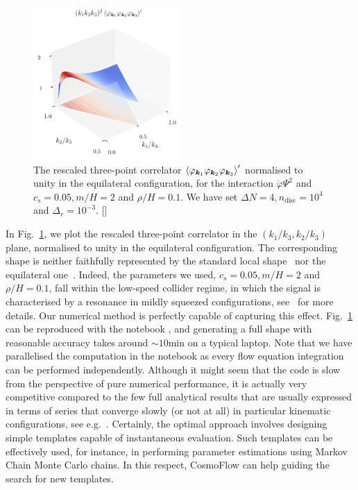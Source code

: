 \documentclass[11pt]{article}
\numberwithin{equation}{section} %
\begin{document}
\begin{figure}[h!]
  \centering
  \includegraphics[width=0.5\textwidth]{Figures/Shape.pdf}
  \vspace*{0.2cm}
  \caption{The rescaled three-point correlator $\braket{\varphi_{\bm{k}_1} \varphi_{\bm{k}_2} \varphi_{\bm{k}_3}}'$ normalised to unity in the equilateral configuration, for the interaction $\dot{\varphi}\Psi^2$ and $c_s = 0.05, m/H = 2$ and $\rho/H=0.1$. We have set $\Delta N = 4, n_{\text{disc}} = 10^4$ and $\Delta_r = 10^{-3}$. [\href{https://github.com/deniswerth/CosmoFlow/blob/main/CosmoFlow/PhiPsi/KinematicDependence.ipynb}{\faGithub}]}
  \label{fig: shape}
\end{figure}


\vskip 4pt
In Fig.~\ref{fig: shape}, we plot the rescaled three-point correlator in the $(k_1/k_3, k_2/k_3)$ plane, normalised to unity in the equilateral configuration. The corresponding shape is neither faithfully represented by the standard local shape~\cite{Gangui:1993tt, Wang:1999vf, Verde:1999ij, Komatsu:2001rj} nor the equilateral one~\cite{Babich:2004gb, Creminelli:2005hu}. Indeed, the parameters we used, $c_s=0.05, m/H=2$ and $\rho/H=0.1$, fall within the low-speed collider regime, in which the signal is characterised by a resonance in mildly squeezed configurations, see~\cite{Jazayeri:2022kjy, Jazayeri:2023xcj} for more details. Our numerical method is perfectly capable of capturing this effect. Fig.~\ref{fig: shape} can be reproduced with the notebook \href{https://github.com/deniswerth/CosmoFlow/blob/main/CosmoFlow/PhiPsi/KinematicDependence.ipynb}{\faGithub}, and generating a full shape with reasonable accuracy takes around $\sim10$min on a typical laptop. Note that we have parallelised the computation in the notebook as every flow equation integration can be performed independently. Although it might seem that the code is slow from the perspective of pure numerical performance, it is actually very competitive compared to the few full analytical results that are usually expressed in terms of series that converge slowly (or not at all) in particular kinematic configurations, see e.g.~\cite{Arkani-Hamed:2018kmz, Sleight:2019mgd, Sleight:2019hfp, Jazayeri:2022kjy, Pimentel:2022fsc, Qin:2022fbv, Qin:2023ejc, Xianyu:2023ytd}. Certainly, the optimal approach involves designing simple templates capable of instantaneous evaluation. Such templates can be effectively used, for instance, in performing parameter estimations using Markov Chain Monte Carlo chains. In this respect, \textsf{CosmoFlow} can help guiding the search for new templates. 
\end{document}
